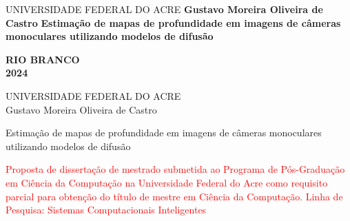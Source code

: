 	\cleardoublepage
	\thispagestyle{empty}
	
	\vspace{-60mm}
	  \begin{singlespace}
	    \begin{center}
	      {\large UNIVERSIDADE FEDERAL DO ACRE}
	      \vskip4.0cm{\textbf{\Large Gustavo Moreira Oliveira de Castro}}
	      \vskip5.0cm {\textbf{Estimação de mapas de profundidade em imagens de câmeras monoculares utilizando modelos de difusão}}
	    \end{center}
	    \begin{center}
	      \vskip10.0cm{\textbf{RIO BRANCO\\2024}}
	    \end{center}
	  \end{singlespace}
	\cleardoublepage
	\thispagestyle{empty}
	
	\vspace{-60mm}
	  \begin{center}
	    {\large UNIVERSIDADE FEDERAL DO ACRE}\\
	    \vspace{3cm}
	    {\large Gustavo Moreira Oliveira de Castro} \\
	    \vspace{3cm}
	    
	    {\large Estimação de mapas de profundidade em imagens de câmeras monoculares utilizando modelos de difusão} \\
	    \vspace{1.5cm}
	  \end{center}
	
	\noindent
	  \begin{flushright}
	    \begin{minipage}[t]{8cm}
	     \textcolor{red}{Proposta de dissertação de mestrado submetida ao Programa de Pós-Graduação em Ciência da Computação na Universidade Federal do Acre como requisito parcial para obtenção do título de mestre em Ciência da Computação. Linha de Pesquisa: Sistemas Computacionais Inteligentes}
	    \end{minipage}
	  \end{flushright}
	
